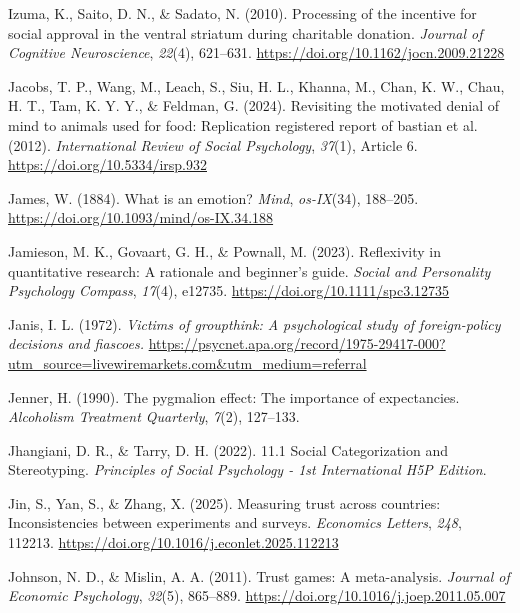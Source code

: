 \documentclass[
  letterpaper,
]{book}
\newlength{\cslhangindent}
\newenvironment{CSLReferences}[2] %
 {\begin{list}{}{%
  \setlength{\itemindent}{0pt}
  \setlength{\leftmargin}{0pt}
  \setlength{\parsep}{0pt}
  \ifodd #1
   \setlength{\leftmargin}{\cslhangindent}
   \setlength{\itemindent}{-1\cslhangindent}
  \fi
  \setlength{\itemsep}{#2\baselineskip}}}
 {\end{list}}
\begin{document}
\begin{CSLReferences}{1}{0}
Izuma, K., Saito, D. N., \& Sadato, N. (2010). Processing of the
incentive for social approval in the ventral striatum during charitable
donation. \emph{Journal of Cognitive Neuroscience}, \emph{22}(4),
621--631. \url{https://doi.org/10.1162/jocn.2009.21228}

Jacobs, T. P., Wang, M., Leach, S., Siu, H. L., Khanna, M., Chan, K. W.,
Chau, H. T., Tam, K. Y. Y., \& Feldman, G. (2024). Revisiting the
motivated denial of mind to animals used for food: Replication
registered report of bastian et al. (2012). \emph{International Review
of Social Psychology}, \emph{37}(1), Article 6.
\url{https://doi.org/10.5334/irsp.932}

James, W. (1884). What is an emotion? \emph{Mind}, \emph{os-IX}(34),
188--205. \url{https://doi.org/10.1093/mind/os-IX.34.188}

Jamieson, M. K., Govaart, G. H., \& Pownall, M. (2023). Reflexivity in
quantitative research: {A} rationale and beginner's guide. \emph{Social
and Personality Psychology Compass}, \emph{17}(4), e12735.
\url{https://doi.org/10.1111/spc3.12735}

Janis, I. L. (1972). \emph{Victims of groupthink: {A} psychological
study of foreign-policy decisions and fiascoes.}
\url{https://psycnet.apa.org/record/1975-29417-000?utm_source=livewiremarkets.com&utm_medium=referral}

Jenner, H. (1990). The pygmalion effect: The importance of expectancies.
\emph{Alcoholism Treatment Quarterly}, \emph{7}(2), 127--133.

Jhangiani, D. R., \& Tarry, D. H. (2022). 11.1 {Social Categorization}
and {Stereotyping}. \emph{Principles of Social Psychology - 1st
International H5P Edition}.

Jin, S., Yan, S., \& Zhang, X. (2025). Measuring trust across countries:
{Inconsistencies} between experiments and surveys. \emph{Economics
Letters}, \emph{248}, 112213.
\url{https://doi.org/10.1016/j.econlet.2025.112213}

Johnson, N. D., \& Mislin, A. A. (2011). Trust games: {A} meta-analysis.
\emph{Journal of Economic Psychology}, \emph{32}(5), 865--889.
\url{https://doi.org/10.1016/j.joep.2011.05.007}


\end{CSLReferences}
\end{document}
